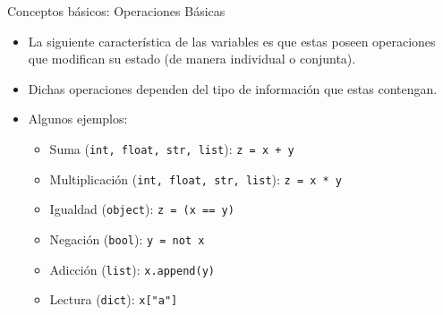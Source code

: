 \documentclass{beamer}
\begin{document}
    \begin{frame}{Conceptos básicos: Operaciones Básicas}
        \begin{itemize}
            \item La siguiente característica de las variables es que estas poseen operaciones que modifican su estado (de manera individual o conjunta).
            \item Dichas operaciones dependen del tipo de información que estas contengan.
            \item Algunos ejemplos:
            \begin{itemize}
                \item Suma (\texttt{int, float, str, list}): \texttt{z = x + y}
                \item Multiplicación (\texttt{int, float, str, list}): \texttt{z = x * y}
                \item Igualdad (\texttt{object}): \texttt{z = (x == y)}
                \item Negación (\texttt{bool}): \texttt{y = not x}
                \item Adicción (\texttt{list}): \texttt{x.append(y)}
                \item Lectura (\texttt{dict}): \texttt{x["a"]}
            \end{itemize}
        \end{itemize}
    \end{frame}
\end{document}
